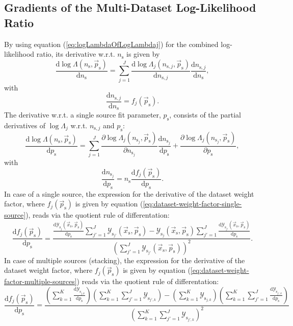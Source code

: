 \documentclass{article}
\newcommand{\ns}{n_{\mathrm{s}}}
\newcommand{\nsj}{n_{\mathrm{s}_j}}
\newcommand{\ps}{\vec{p}_{\mathrm{s}}}
\newcommand{\xs}{\vec{x}_{\mathrm{s}}}
\begin{document}
\subsection{Gradients of the Multi-Dataset Log-Likelihood Ratio}

By using equation (\ref{eq:logLambdaOfLogLambdaj}) for the combined log-likelihood
ratio, its derivative w.r.t. $\ns$ is given by
\begin{equation}
 \frac{\mathrm{d} \log \Lambda(\ns,\ps)}{\mathrm{d} \ns} = \sum_{j=1}^{J} \frac{\mathrm{d} \log \Lambda_j(n_{\mathrm{s},j},\ps)}{\mathrm{d} n_{\mathrm{s},j}} \frac{\mathrm{d} n_{\mathrm{s},j}}{\mathrm{d} \ns},
\end{equation}
with
\begin{equation}
\frac{\mathrm{d} n_{\mathrm{s},j}}{\mathrm{d} \ns} = f_j(\ps).
\end{equation}
The derivative w.r.t. a single source fit parameter, $p_{\mathrm{s}}$, consists
of the partial derivatives of $\log \Lambda_j$ w.r.t. $n_{\mathrm{s},j}$ and
$p_{\mathrm{s}}$:
\begin{equation}
 \frac{\mathrm{d} \log \Lambda(\ns,\ps)}{\mathrm{d} p_{\mathrm{s}}} = \sum_{j=1}^{J} \frac{\partial \log \Lambda_j(\nsj,\ps)}{\partial \nsj} \frac{\mathrm{d} \nsj}{\mathrm{d} p_{\mathrm{s}}} + \frac{\partial \log \Lambda_j(\nsj,\ps)}{\partial p_{\mathrm{s}}},
\end{equation}
with
\begin{equation}
 \frac{\mathrm{d} \nsj}{\mathrm{d} p_{\mathrm{s}}} = \ns \frac{\mathrm{d} f_j(\ps)}{\mathrm{d} p_{\mathrm{s}}}.
\end{equation}
In case of a single source, the expression for the derivative of the dataset
weight factor, where $f_j(\ps)$ is given by equation (\ref{eq:dataset-weight-factor-single-source}),
reads via the quotient rule of differentation:
\begin{equation}
\frac{\mathrm{d}f_j(\ps)}{\mathrm{d}p_{\mathrm{s}}} = \frac{\frac{\mathrm{d}\mathcal{Y}_{\mathrm{s}_j}(\xs,\ps)}{\mathrm{d}p_{\mathrm{s}}} \sum_{j'=1}^{J}\mathcal{Y}_{\mathrm{s}_{j'}}(\xs,\ps) - \mathcal{Y}_{\mathrm{s}_j}(\xs,\ps) \sum_{j'=1}^{J} \frac{\mathrm{d}\mathcal{Y}_{\mathrm{s}_{j'}}(\xs,\ps)}{\mathrm{d}p_{\mathrm{s}}} }{\left( \sum_{j'=1}^{J} \mathcal{Y}_{\mathrm{s}_{j'}}(\xs,\ps) \right)^2}.
\end{equation}
In case of multiple sources (stacking), the expression for the derivative of the
dataset weight factor, where $f_j(\ps)$ is given by equation
(\ref{eq:dataset-weight-factor-multiple-sources}) reads via the quotient rule of
differentation:
\begin{equation}
 \frac{\mathrm{d} f_j(\ps)}{\mathrm{d}p_{\mathrm{s}}} =
    \frac{\left(\sum_{k=1}^{K} \frac{\mathrm{d}\mathcal{Y}_{\mathrm{s}_{j,k}}}{\mathrm{d}p_{\mathrm{s}}}\right) \left(\sum_{k=1}^{K}\sum_{j'=1}^{J}\mathcal{Y}_{\mathrm{s}_{j',k}}\right) - \left(\sum_{k=1}^{K}\mathcal{Y}_{\mathrm{s}_{j,k}}\right)\left(\sum_{k=1}^{K}\sum_{j'=1}^{J}\frac{\mathrm{d}\mathcal{Y}_{\mathrm{s}_{j',k}}}{\mathrm{d}p_{\mathrm{s}}}\right)}
         {\left(\sum_{k=1}^{K}\sum_{j'=1}^{J}\mathcal{Y}_{\mathrm{s}_{j',k}} \right)^2}
\end{equation}
\end{document}
